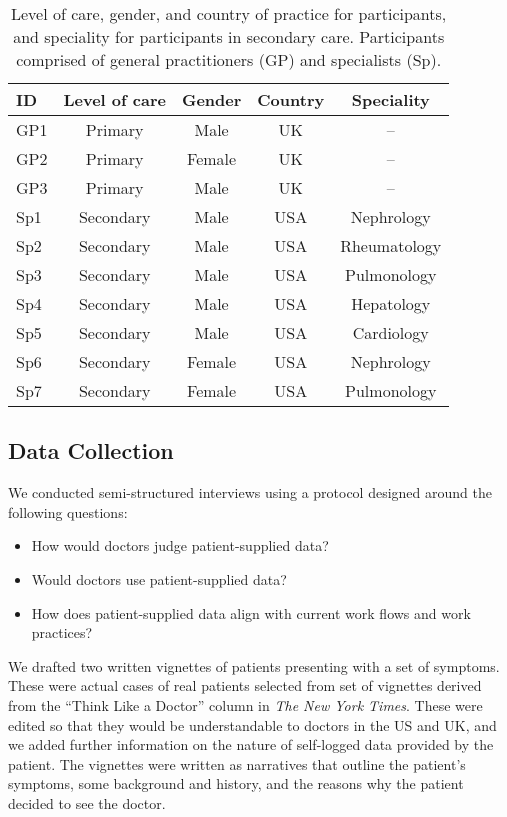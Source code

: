 \documentclass{sigchi}
\begin{document}
\begin{table}[t]
    \centering
    \setlength\extrarowheight{0.0cm}
    \begin{tabular}{lcccc}
     \toprule
     ID & Level of care & Gender & Country & Speciality \\ \midrule
     GP1 & Primary & Male & UK & -- \\
     GP2 & Primary & Female & UK & -- \\
     GP3 & Primary & Male & UK & -- \\
     
     Sp1 & Secondary & Male & USA & Nephrology \\
     Sp2 & Secondary & Male & USA & Rheumatology \\
     Sp3 & Secondary & Male & USA & Pulmonology \\
     Sp4 & Secondary & Male & USA & Hepatology \\
     Sp5 & Secondary & Male & USA & Cardiology \\
     Sp6 & Secondary & Female & USA & Nephrology \\
     Sp7 & Secondary & Female & USA & Pulmonology \\
     \bottomrule
    \end{tabular}
    \caption{Level of care, gender, and country of practice for participants, and speciality for participants in secondary care. Participants comprised of general practitioners (GP) and specialists (Sp).}
    \label{tab:participants}
\end{table}

\subsection{Data Collection}
We conducted semi-structured interviews using a protocol designed around the following questions:
\begin{itemize}
    \item How would doctors judge patient-supplied data?
    \item Would doctors use patient-supplied data?
    \item How does patient-supplied data align with current work flows and work practices?
\end{itemize}

We drafted two written vignettes of patients presenting with a set of symptoms.  These were actual cases of real patients selected from set of vignettes derived from the ``Think Like a Doctor'' column in \emph{The New York Times}.  These were edited  so that they would be understandable to doctors in the US and UK, and we added further information on the nature of self-logged data provided by the patient.  The vignettes were written as narratives that outline the patient's symptoms, some background and history, and the reasons why the patient decided to see the doctor.  
\end{document}
